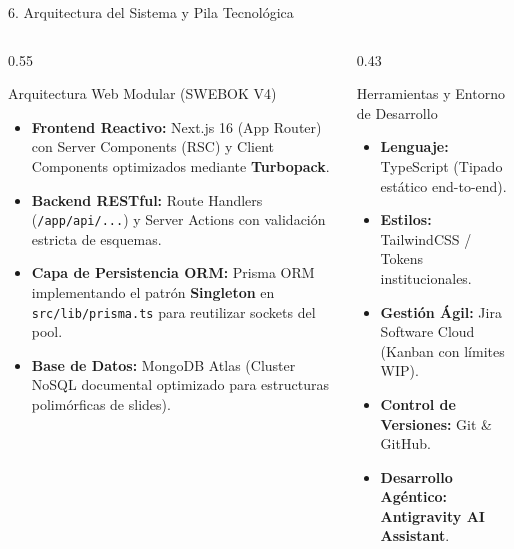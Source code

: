 \documentclass[aspectratio=169, 10pt, spanish]{beamer}
\begin{document}
\begin{frame}{6. Arquitectura del Sistema y Pila Tecnológica}
\begin{columns}[T]
    \begin{column}{0.55\textwidth}
        \begin{academicbox}{Arquitectura Web Modular (SWEBOK V4)}
            \scriptsize
            \begin{itemize}
                \item \textbf{Frontend Reactivo:} Next.js 16 (App Router) con Server Components (RSC) y Client Components optimizados mediante \textbf{Turbopack}.
                \item \textbf{Backend RESTful:} Route Handlers (\texttt{/app/api/...}) y Server Actions con validación estricta de esquemas.
                \item \textbf{Capa de Persistencia ORM:} Prisma ORM implementando el patrón \textbf{Singleton} en \texttt{src/lib/prisma.ts} para reutilizar sockets del pool.
                \item \textbf{Base de Datos:} MongoDB Atlas (Cluster NoSQL documental optimizado para estructuras polimórficas de slides).
            \end{itemize}
        \end{academicbox}
    \end{column}
    \begin{column}{0.43\textwidth}
        \begin{formalbox}{Herramientas y Entorno de Desarrollo}
            \scriptsize
            \begin{itemize}
                \item \textbf{Lenguaje:} TypeScript (Tipado estático end-to-end).
                \item \textbf{Estilos:} TailwindCSS / Tokens institucionales.
                \item \textbf{Gestión Ágil:} Jira Software Cloud (Kanban con límites WIP).
                \item \textbf{Control de Versiones:} Git \& GitHub.
                \item \textbf{Desarrollo Agéntico:} \textbf{Antigravity AI Assistant}.
            \end{itemize}
        \end{formalbox}
    \end{column}
\end{columns}
\end{frame}
\end{document}
